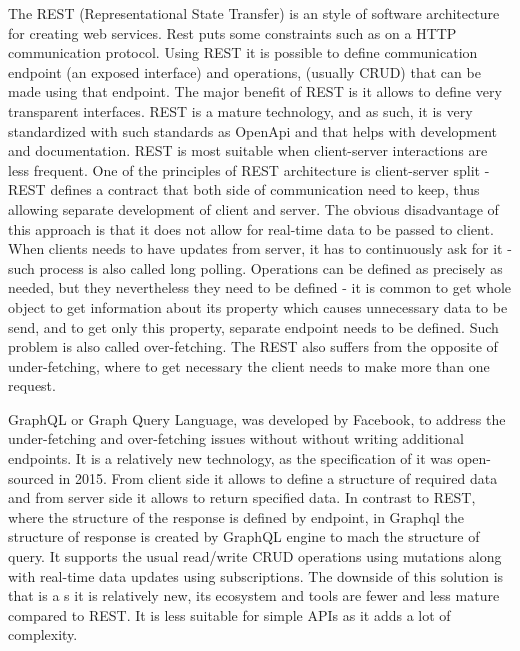 The REST (Representational State Transfer) is an style of software architecture for creating web services. Rest puts some constraints such as  on a HTTP communication protocol. Using REST it is possible to define communication endpoint (an exposed interface) and operations, (usually CRUD) that can be made using that endpoint. The major benefit of REST is it allows to define very transparent interfaces. REST is a mature technology, and as such, it is very standardized with such standards as OpenApi and that helps with development and documentation. REST is most suitable when client-server interactions are less frequent. One of the principles of REST architecture is client-server split - REST defines a contract that both side of communication need to keep, thus allowing separate development of client and server. The obvious disadvantage of this approach is that it does not allow for real-time data to be passed to client. When clients needs to have updates from server, it has to continuously ask for it - such process is also called long polling. Operations can be defined as precisely as needed, but they nevertheless they need to be defined - it is common to get whole object to get information about its property which causes unnecessary data to be send, and to get only this property, separate endpoint needs to be defined. Such problem is also called over-fetching. The REST also suffers from the opposite of under-fetching, where to get necessary the client needs to make more than one request.

GraphQL or Graph Query Language, was developed by Facebook, to address the under-fetching and over-fetching issues without without writing additional endpoints.  It is a relatively new technology, as the specification of it was open-sourced in 2015. From client side it allows to define a structure of required data and from server side it allows to return specified data. In contrast to REST, where the structure of the response is defined by endpoint, in Graphql the structure of response is created by GraphQL engine to mach the structure of query. It supports the usual read/write CRUD operations using mutations along with real-time data updates using subscriptions. The downside of this solution is that is a s it is relatively new, its ecosystem and tools are fewer and less mature compared to REST. It is less suitable for simple APIs as it adds a lot of complexity.

